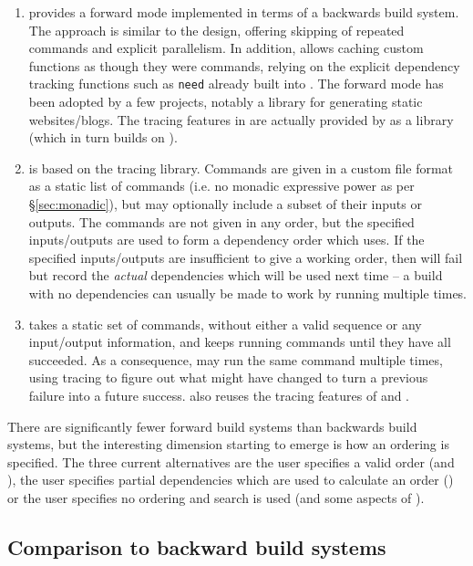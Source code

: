 \begin{enumerate}
\item \Shake \cite{shake} provides a forward mode implemented in terms of a backwards build system. The approach is similar to the \Fabricate design, offering skipping of repeated commands and explicit parallelism. In addition, \Shake allows caching custom functions as though they were commands, relying on the explicit dependency tracking functions such as \texttt{need} already built into \Shake. The forward mode has been adopted by a few projects, notably a library for generating static websites/blogs. The tracing features in \Rattle are actually provided by \Shake as a library (which in turn builds on \Fsatrace).
\item \Fac \cite{fac} is based on the \Bigbro tracing library. Commands are given in a custom file format as a static list of commands (i.e. no monadic expressive power as per \S\ref{sec:monadic}), but may optionally include a subset of their inputs or outputs. The commands are not given in any order, but the specified inputs/outputs are used to form a dependency order which \Fac uses. If the specified inputs/outputs are insufficient to give a working order, then \Fac will fail but record the \emph{actual} dependencies which will be used next time -- a build with no dependencies can usually be made to work by running \Fac multiple times.
\item \Stroll \cite{stroll} takes a static set of commands, without either a valid sequence or any input/output information, and keeps running commands until they have all succeeded. As a consequence, \Stroll may run the same command multiple times, using tracing to figure out what might have changed to turn a previous failure into a future success. \Stroll also reuses the tracing features of \Shake and \Fsatrace.
\end{enumerate}

There are significantly fewer forward build systems than backwards build systems, but the interesting dimension starting to emerge is how an ordering is specified. The three current alternatives are the user specifies a valid order (\Fabricate and \Rattle), the user specifies partial dependencies which are used to calculate an order (\Fac) or the user specifies no ordering and search is used (\Stroll and some aspects of \Fac).

\subsection{Comparison to backward build systems}
\label{sec:remote_execution}

